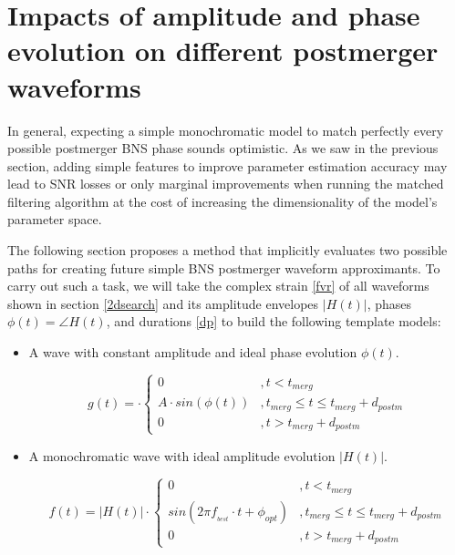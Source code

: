 \FloatBarrier





\section{Impacts of amplitude and phase evolution on different postmerger  waveforms}\label{cdm}

In general, expecting a simple monochromatic model to match perfectly every possible postmerger BNS phase sounds optimistic. As we saw in the previous section, adding simple features to improve parameter estimation accuracy may lead to SNR losses or only marginal improvements when running the matched filtering algorithm at the cost of increasing the dimensionality of the model's parameter space.

The following section proposes a method that implicitly evaluates two possible paths for creating future simple  BNS postmerger waveform approximants. To carry out such a task, we will take the complex strain \ref{fvr} of all waveforms shown in section \ref{2dsearch} and its amplitude envelopes $|H(t)|$, phases $\phi(t)=\angle H(t)$, and durations \ref{dp} to build the following template models:

\begin{itemize}[leftmargin=*]
\item A wave with constant amplitude and ideal phase evolution $\phi(t)$.

\begin{equation}\label{pha-evol}
g(t) = \cdot \begin{cases} 
      0 &, t< t_{merg} \\
      A \cdot sin(\phi(t)) &, t_{merg} \leq t \leq t_{merg} + d_{postm} \\
      0 &, t> t_{merg} + d_{postm}
   \end{cases}
\end{equation}


\item A monochromatic wave with ideal amplitude evolution $|H(t)|$.

\begin{equation}\label{a-evol}
f(t) = |H(t)| \cdot \begin{cases} 
      0 &, t< t_{merg} \\
      sin(2\pi f_{_{best}}\cdot t + \phi_{opt}) &, t_{merg} \leq t \leq t_{merg} + d_{postm} \\
      0 &, t> t_{merg} + d_{postm}
   \end{cases}
\end{equation}

\end{itemize}


